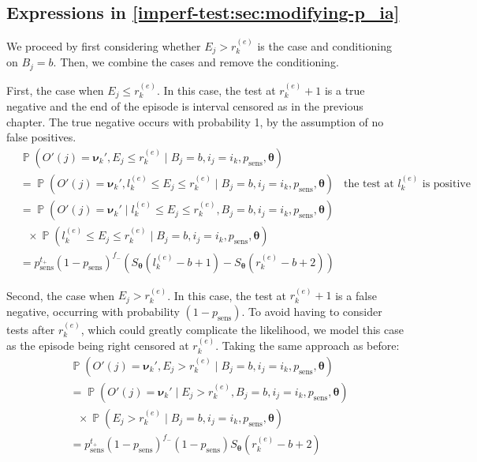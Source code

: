 \documentclass[12pt]{article}
\DeclareMathOperator{\prob}{\mathbb{P}}
\renewcommand{\vec}[1]{\bm{#1}}
\newcommand{\psens}{p_\text{sens}}
\newcommand{\sched}{\mathbb{T}}
\begin{document}
\subsection{Expressions in \cref{imperf-test:sec:modifying-p_ia}} \label{sec:p-ia-dash}

We proceed by first considering whether $E_j > r_k^{(e)}$ is the case and conditioning on $B_j = b$.
Then, we combine the cases and remove the conditioning.

First, the case when $E_j \leq r_k^{(e)}$.
In this case, the test at $r_k^{(e)}+1$ is a true negative and the end of the episode is interval censored as in the previous chapter.
The true negative occurs with probability 1, by the assumption of no false positives.
\begin{align}
&\prob(O'(j) = \vec{\nu}_k', E_j \leq r_k^{(e)} \mid B_j = b, i_j = i_k, \psens, \vec{\theta}) \\
&= \prob(O'(j) = \vec{\nu}_k', l_k^{(e)} \leq E_j \leq r_k^{(e)} \mid B_j = b, i_j = i_k, \psens, \vec{\theta}) &\text{the test at $l_k^{(e)}$ is positive} \\
&= \prob(O'(j) = \vec{\nu}_k' \mid l_k^{(e)} \leq E_j \leq r_k^{(e)}, B_j = b, i_j = i_k, \psens, \vec{\theta}) \\
&\ \ \  \times \prob(l_k^{(e)} \leq E_j \leq r_k^{(e)} \mid B_j = b, i_j = i_k, \psens, \vec{\theta}) \\
&= p_\text{sens}^{t_+} (1 - p_\text{sens})^{f_-} \left( S_{\vec{\theta}}(l_k^{(e)} - b + 1) - S_{\vec{\theta}}(r_k^{(e)} - b + 2) \right)
\label{imperf-test:eq:ll-ei-lt-ri}
\end{align}

Second, the case when $E_j > r_k^{(e)}$.
In this case, the test at $r_k^{(e)}+1$ is a false negative, occurring with probability $(1 - p_\text{sens})$.
To avoid having to consider tests after $r_k^{(e)}$, which could greatly complicate the likelihood, we model this case as the episode being right censored at $r_k^{(e)}$.
Taking the same approach as before:
\begin{align}
&\prob(O'(j) = \vec{\nu}_k', E_j > r_k^{(e)} \mid B_j = b, i_j = i_k, \psens, \vec{\theta}) \\
&= \prob(O'(j) = \vec{\nu}_k' \mid E_j > r_k^{(e)}, B_j = b, i_j = i_k, \psens, \vec{\theta}) \\
  &\ \ \  \times \prob(E_j > r_k^{(e)} \mid B_j = b, i_j = i_k, \psens, \vec{\theta}) \\
&= p_\text{sens}^{t_+} (1 - p_\text{sens})^{f_-} (1 - p_\text{sens}) S_{\vec{\theta}}(r_k^{(e)} - b + 2)
\label{imperf-test:eq:ll-ei-gt-ri}
\end{align}
\end{document}
